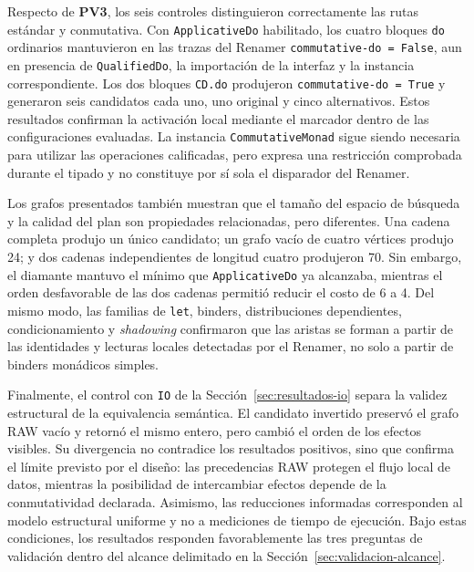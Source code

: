 Respecto de \textbf{PV3}, los seis controles distinguieron correctamente las rutas estándar y conmutativa. Con \texttt{ApplicativeDo} habilitado, los cuatro bloques \texttt{do} ordinarios mantuvieron en las trazas del Renamer \texttt{commutative-do = False}, aun en presencia de \texttt{QualifiedDo}, la importación de la interfaz y la instancia correspondiente. Los dos bloques \texttt{CD.do} produjeron \texttt{commutative-do = True} y generaron seis candidatos cada uno, uno original y cinco alternativos. Estos resultados confirman la activación local mediante el marcador dentro de las configuraciones evaluadas. La instancia \texttt{CommutativeMonad} sigue siendo necesaria para utilizar las operaciones calificadas, pero expresa una restricción comprobada durante el tipado y no constituye por sí sola el disparador del Renamer.

Los grafos presentados también muestran que el tamaño del espacio de búsqueda y la calidad del plan son propiedades relacionadas, pero diferentes. Una cadena completa produjo un único candidato; un grafo vacío de cuatro vértices produjo 24; y dos cadenas independientes de longitud cuatro produjeron 70. Sin embargo, el diamante mantuvo el mínimo que \texttt{ApplicativeDo} ya alcanzaba, mientras el orden desfavorable de las dos cadenas permitió reducir el costo de 6 a 4. Del mismo modo, las familias de \texttt{let}, binders, distribuciones dependientes, condicionamiento y \textit{shadowing} confirmaron que las aristas se forman a partir de las identidades y lecturas locales detectadas por el Renamer, no solo a partir de binders monádicos simples.

Finalmente, el control con \texttt{IO} de la Sección~\ref{sec:resultados-io} separa la validez estructural de la equivalencia semántica. El candidato invertido preservó el grafo RAW vacío y retornó el mismo entero, pero cambió el orden de los efectos visibles. Su divergencia no contradice los resultados positivos, sino que confirma el límite previsto por el diseño: las precedencias RAW protegen el flujo local de datos, mientras la posibilidad de intercambiar efectos depende de la conmutatividad declarada. Asimismo, las reducciones informadas corresponden al modelo estructural uniforme y no a mediciones de tiempo de ejecución. Bajo estas condiciones, los resultados responden favorablemente las tres preguntas de validación dentro del alcance delimitado en la Sección~\ref{sec:validacion-alcance}.
